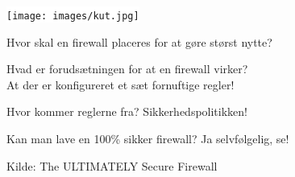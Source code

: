 
\begin{center}
\colorbox{white}{\texttt{[image: images/kut.jpg]}}  
\end{center}

\begin{list2}
\item Hvor skal en firewall placeres for at gøre størst nytte?
\item Hvad er forudsætningen for at en firewall virker?\\
At der er konfigureret et sæt fornuftige regler!
\item Hvor kommer reglerne fra? Sikkerhedspolitikken!
\item Kan man lave en 100\% sikker firewall? Ja selvfølgelig, se!
\end{list2}


{\small Kilde:  The ULTIMATELY Secure Firewall}



